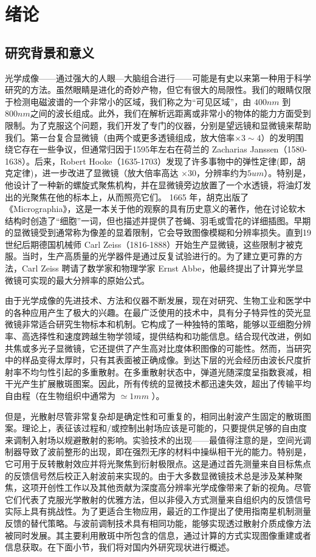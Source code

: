
\chapter{绪论}\label{chap:1}
\section{研究背景和意义}
光学成像——通过强大的人眼—大脑组合进行——可能是有史以来第一种用于科学研究的方法。虽然眼睛是进化的奇妙产物，但它有很大的局限性。我们的眼睛仅限于检测电磁波谱的一个非常小的区域，我们称之为“可见区域”，由 $400 nm$ 到 $800 nm$之间的波长组成。此外，我们在解析远距离或非常小的物体的能力方面受到限制。为了克服这个问题，我们开发了专门的仪器，分别是望远镜和显微镜来帮助我们。第一台复合显微镜（由两个或更多透镜组成，放大倍率$ \times 3 \sim 4$）的发明围绕它存在一些争议，但通常归因于1595年左右在荷兰的 Zacharias Janssen（1580-1638）。后来，Robert Hooke（1635-1703）发现了许多事物中的弹性定律(即，胡克定律)，进一步改进了显微镜（放大倍率高达 $ \times 30$，分辨率约为$5 um$）。特别是，他设计了一种新的螺旋式聚焦机构，并在显微镜旁边放置了一个水透镜，将油灯发出的光聚焦在他的标本上，从而照亮它们。 1665 年，胡克出版了《Micrographia》\cite{robert_micrographia_2015}，这是一本关于他的观察的具有历史意义的著作，他在讨论软木结构时创造了“细胞”一词，但也描述并提供了苍蝇、羽毛或雪花的详细插图。早期的显微镜受到通常称为像差的显着限制，它会导致图像模糊和分辨率损失。直到19世纪后期德国机械师 Carl Zeiss（1816-1888）开始生产显微镜，这些限制才被克服。当时，生产高质量的光学器件是通过反复试验进行的。为了建立更可靠的方法，Carl Zeiss 聘请了数学家和物理学家 Ernst Abbe，他最终提出了计算光学显微镜可实现的最大分辨率的原始公式\cite{abbe_beitrage_1873}。

由于光学成像的先进技术、方法和仪器不断发展，现在对研究、生物工业和医学中的各种应用产生了极大的兴趣。在最广泛使用的技术中，具有分子特异性的荧光显微镜非常适合研究生物标本和机制。它构成了一种独特的策略，能够以亚细胞分辨率、高选择性和速度跨越生物学领域，提供结构和功能信息\cite{Lichtman2005}。结合现代改进，例如共焦或多光子显微镜，它还提供了产生高对比度体积图像的可能性。然而，当研究中的样品变得太厚时，只有其表面被正确成像。到达下层的光会经历由波长尺度折射率不均匀性引起的多重散射。在多重散射状态中，弹道光随深度呈指数衰减，相干光产生扩展散斑图案\cite{Goodman1976}。因此，所有传统的显微技术都迅速失效，超出了传输平均自由程（在生物组织中通常为 $\simeq 1 mm$ \cite{ntziachristos_going_2010}）。

但是，光散射尽管非常复杂却是确定性和可重复的，相同出射波产生固定的散斑图案。理论上，表征该过程和/或控制出射场应该是可能的，只要提供足够的自由度来调制入射场以规避散射的影响。实验技术的出现——最值得注意的是，空间光调制器导致了波前整形的出现，即在强烈无序的材料中操纵相干光的能力。特别是，它可用于反转散射效应并将光聚焦到衍射极限点\cite{Vellekoop2007}。这是通过首先测量来自目标焦点的反馈信号然后校正入射波前来实现的。由于大多数显微镜技术总是涉及某种聚焦，这项开创性工作以及其他贡献为深度高分辨率光学成像带来了新的视角。尽管它们代表了克服光学散射的优雅方法，但以非侵入方式测量来自组织内的反馈信号实际上具有挑战性。为了更适合生物应用，最近的工作提出了使用指南星机制测量反馈的替代策略。与波前调制技术具有相同功能，能够实现透过散射介质成像方法被同时发展。其主要利用散斑中所包含的信息，通过计算的方式实现图像重建或者信息获取。在下面小节，我们将对国内外研究现状进行概述。

